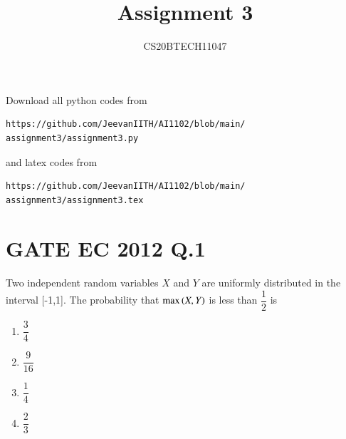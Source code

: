 \documentclass[journal,12pt,twocolumn]{IEEEtran}
\begin{document}
\let\vec\mathbf
\renewcommand{\thefigure}{\theproblem}
\def\putbox#1#2#3{\makebox[0in][l]{\makebox[#1][l]{}\raisebox{\baselineskip}[0in][0in]{\raisebox{#2}[0in][0in]{#3}}}}
     \def\rightbox#1{\makebox[0in][r]{#1}}
     \def\centbox#1{\makebox[0in]{#1}}
     \def\topbox#1{\raisebox{-\baselineskip}[0in][0in]{#1}}
     \def\midbox#1{\raisebox{-0.5\baselineskip}[0in][0in]{#1}}
\vspace{3cm}
\title{Assignment 3}
\author{CS20BTECH11047}
\maketitle
\newpage
\bigskip
\renewcommand{\thefigure}{\arabic{figure}}
\renewcommand{\thetable}{\arabic{table}}
Download all python codes from 
\begin{lstlisting}
https://github.com/JeevanIITH/AI1102/blob/main/
assignment3/assignment3.py
\end{lstlisting}
%
and latex codes from 
%
\begin{lstlisting}
https://github.com/JeevanIITH/AI1102/blob/main/
assignment3/assignment3.tex
\end{lstlisting}
\section*{GATE EC 2012 Q.1}
Two independent random variables $X$ and $Y$ are uniformly distributed in the interval [-1,1]. The probability that $\max \left(X,Y\right)$ is less than $\dfrac{1}{2}$ is 
\begin{multicols}{4}
\begin{enumerate}
\item $\dfrac{3}{4}$
\item $\dfrac{9}{16}$
\item $\dfrac{1}{4}$
\item $\dfrac{2}{3}$
\end{enumerate}
\end{multicols}
\end{document}

